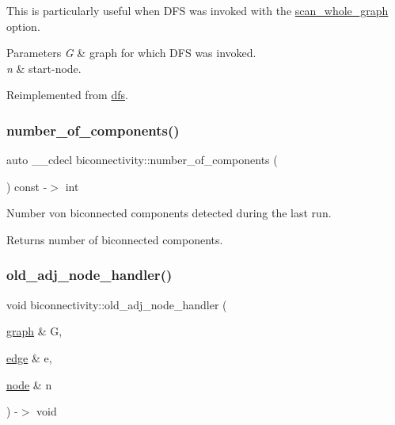 This is particularly useful when D\+FS was invoked with the \mbox{\hyperlink{classdfs_aa7c864a6f3a120720138b187b3ed95b5}{scan\+\_\+whole\+\_\+graph}} option.


\begin{DoxyParams}{Parameters}
{\em G} & graph for which D\+FS was invoked. \\
\hline
{\em n} & start-\/node. \\
\hline
\end{DoxyParams}


Reimplemented from \mbox{\hyperlink{classdfs_a3b5fbea7a7baed9946cfb4444a7f20ea}{dfs}}.

\mbox{\label{classbiconnectivity_a831d05bc43e9dffc37132439ca421a97}} 
\subsubsection{\texorpdfstring{number\+\_\+of\+\_\+components()}{number\_of\_components()}}
{\footnotesize\ttfamily auto \+\_\+\+\_\+cdecl biconnectivity\+::number\+\_\+of\+\_\+components (\begin{DoxyParamCaption}{ }\end{DoxyParamCaption}) const -\/$>$ int
	\hspace{0.3cm}{\ttfamily [inline]}}



Number von biconnected components detected during the last run. 

\begin{DoxyReturn}{Returns}
number of biconnected components. 
\end{DoxyReturn}
\mbox{\label{classbiconnectivity_a88f74ebbf09a22bb657dc30217c93158}} 
\subsubsection{\texorpdfstring{old\+\_\+adj\+\_\+node\+\_\+handler()}{old\_adj\_node\_handler()}}
{\footnotesize\ttfamily void biconnectivity\+::old\+\_\+adj\+\_\+node\+\_\+handler (\begin{DoxyParamCaption}\item[{\mbox{\hyperlink{classgraph}{graph}} \&}]{G,  }\item[{\mbox{\hyperlink{classedge}{edge}} \&}]{e,  }\item[{\mbox{\hyperlink{classnode}{node}} \&}]{n }\end{DoxyParamCaption}) -\/$>$ void\hspace{0.3cm}{\ttfamily [virtual]}}



